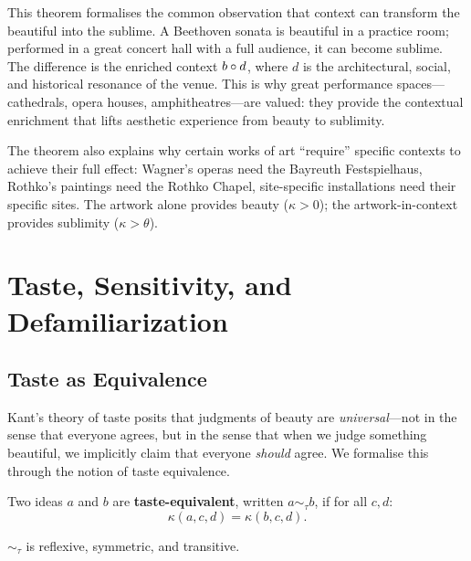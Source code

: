 \begin{remark}
This theorem formalises the common observation that context can transform the beautiful into the sublime.  A Beethoven sonata is beautiful in a practice room; performed in a great concert hall with a full audience, it can become sublime.  The difference is the enriched context $b \circ d$, where $d$ is the architectural, social, and historical resonance of the venue.  This is why great performance spaces---cathedrals, opera houses, amphitheatres---are valued: they provide the contextual enrichment that lifts aesthetic experience from beauty to sublimity.

The theorem also explains why certain works of art ``require'' specific contexts to achieve their full effect: Wagner's operas need the Bayreuth Festspielhaus, Rothko's paintings need the Rothko Chapel, site-specific installations need their specific sites.  The artwork alone provides beauty ($\kappa > 0$); the artwork-in-context provides sublimity ($\kappa > \theta$).
\end{remark}

\section{Taste, Sensitivity, and Defamiliarization}
\label{sec:kant:taste}

\subsection{Taste as Equivalence}

Kant's theory of taste posits that judgments of beauty are
\emph{universal}---not in the sense that everyone agrees, but in the sense
that when we judge something beautiful, we implicitly claim that everyone
\emph{should} agree.  We formalise this through the notion of taste
equivalence.

\begin{definition}
\label{def:taste-equiv}
Two ideas $a$ and $b$ are \textbf{taste-equivalent}, written
$a \sim_{\tau} b$, if for all $c, d$:
\[
  \kappa(a, c, d) = \kappa(b, c, d).
\]
\end{definition}

\begin{theorem}
\label{thm:taste-equiv-er}
$\sim_{\tau}$ is reflexive, symmetric, and transitive.
\end{theorem}

